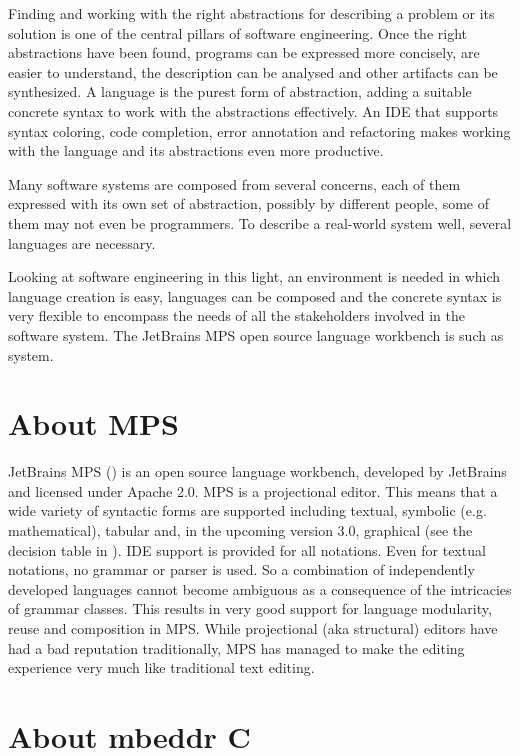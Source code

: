 \documentclass[10pt, conference, compsocconf]{IEEEtran}
\begin{document}
\noindent
Finding and working with the right abstractions for describing a
problem or its solution is one of the central pillars of software engineering.
Once the right abstractions have been found, programs can be expressed more
concisely, are easier to understand, the description can be analysed and other
artifacts can be synthesized. A language is the purest form of abstraction,
adding a suitable concrete syntax to work with the abstractions effectively. An
IDE that supports syntax coloring, code completion, error annotation and
refactoring makes working with the language and its abstractions even more
productive.

Many software systems are composed from several concerns, each of them expressed
with its own set of abstraction, possibly by different people, some of them may
not even be programmers. To describe a real-world system well, several
languages are necessary.

Looking at software engineering in this light, an environment is needed in
which language creation is easy, languages can be composed and the concrete
syntax is very flexible to encompass the needs of all the stakeholders involved
in the software system. The JetBrains MPS open source language workbench is such
as system.

\section{About MPS}
 
\noindent JetBrains MPS () is an open source
language workbench, developed by JetBrains and licensed under Apache 2.0. MPS is
a projectional editor. This means that a wide variety of syntactic forms are
supported including textual, symbolic (e.g. mathematical), tabular and, in the
upcoming version 3.0, graphical (see the decision table in ).
IDE support is provided for all notations. Even for textual notations, no
grammar or parser is used. So a combination of independently developed languages
cannot become ambiguous as a consequence of the intricacies of grammar classes.
This results in very good support for language modularity, reuse and composition
in MPS. While projectional (aka structural) editors have had a bad reputation
traditionally, MPS has managed to make the editing experience very much like
traditional text editing.
 
\section{About mbeddr C}
\end{document}
